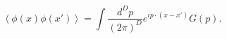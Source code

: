 \begin{equation}
    \left<
        \phi(x)\phi(x')
    \right>
        =\int \frac{d^Dp}{(2\pi)^D}e^{ip\cdot (x-x')}G(p).
\end{equation}

